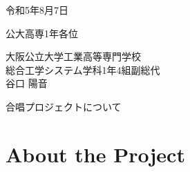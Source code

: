 
\begin{flushright}
    令和5年8月7日
\end{flushright}
\begin{flushleft}
    公大高専1年各位
\end{flushleft}
\begin{flushright}
    大阪公立大学工業高等専門学校\\
    総合工学システム学科1年4組副総代\\
    谷口 陽音\\
\end{flushright}
\begin{center}
    合唱プロジェクトについて
\end{center}
\section{About the Project}
